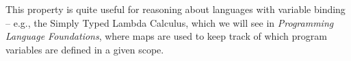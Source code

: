 \documentclass[12pt]{report}
\begin{document}
This property is quite useful for reasoning about languages with
    variable binding -- e.g., the Simply Typed Lambda Calculus, which
    we will see in \textit{Programming Language Foundations}, where maps are
    used to keep track of which program variables are defined in a
    given scope. 
\begin{coqdoccode}
\coqdocemptyline
\end{coqdoccode}
\end{document}

